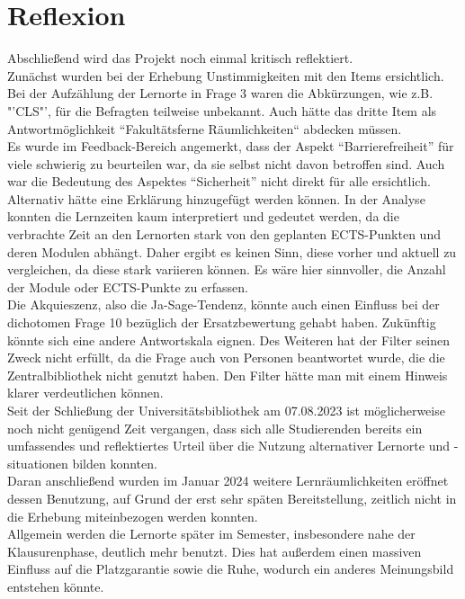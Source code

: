 \documentclass[11pt, a4paper]{article}
\begin{document}
\section{Reflexion}
Abschließend wird das Projekt noch einmal kritisch reflektiert. \\
Zunächst wurden bei der Erhebung Unstimmigkeiten mit den Items ersichtlich.
Bei der Aufzählung der Lernorte in Frage 3 waren die Abkürzungen, wie z.B. "'CLS"', für die Befragten teilweise unbekannt. Auch hätte das dritte Item als Antwortmöglichkeit “Fakultätsferne Räumlichkeiten“ abdecken müssen. \\
Es wurde im Feedback-Bereich angemerkt, dass der Aspekt “Barrierefreiheit” für viele schwierig zu beurteilen war, da sie selbst nicht davon betroffen sind. Auch war die Bedeutung des Aspektes “Sicherheit” nicht direkt für alle ersichtlich. Alternativ hätte eine Erklärung hinzugefügt werden können.
In der Analyse konnten die Lernzeiten kaum interpretiert und gedeutet werden, da die verbrachte Zeit an den Lernorten stark von den geplanten ECTS-Punkten und deren Modulen abhängt. Daher ergibt es keinen Sinn, diese vorher und aktuell zu vergleichen, da diese stark variieren können. Es wäre hier sinnvoller, die Anzahl der Module oder ECTS-Punkte zu erfassen.\\
Die Akquieszenz, also die Ja-Sage-Tendenz, könnte auch einen Einfluss bei der dichotomen Frage 10 bezüglich der Ersatzbewertung gehabt haben. Zukünftig könnte sich eine andere Antwortskala eignen. Des Weiteren hat der Filter seinen Zweck nicht erfüllt, da die Frage auch von Personen beantwortet wurde, die die Zentralbibliothek nicht genutzt haben. Den Filter hätte man mit einem Hinweis klarer verdeutlichen können.\\
Seit der Schließung der Universitätsbibliothek am 07.08.2023 ist möglicherweise noch nicht genügend Zeit vergangen, dass sich alle Studierenden bereits ein umfassendes und reflektiertes Urteil über die Nutzung alternativer Lernorte und -situationen bilden konnten. \\
Daran anschließend wurden im Januar 2024 weitere Lernräumlichkeiten eröffnet dessen Benutzung, auf Grund der erst sehr späten Bereitstellung, zeitlich nicht in die Erhebung miteinbezogen werden konnten. \\
Allgemein werden die Lernorte später im Semester, insbesondere nahe der Klausurenphase, deutlich mehr benutzt. Dies hat außerdem einen massiven Einfluss auf die Platzgarantie sowie die Ruhe, wodurch ein anderes Meinungsbild entstehen könnte.\\
\end{document}
